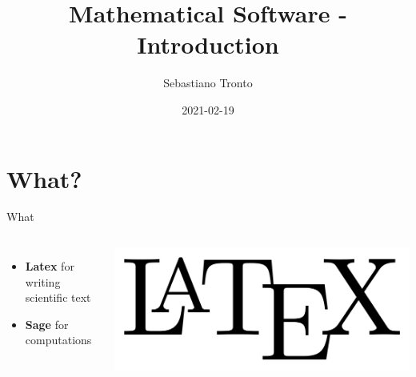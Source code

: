 \documentclass[11pt]{beamer}
\author[\texttt{sebastiano.tronto@uni.lu}]{Sebastiano Tronto}
\title{Mathematical Software - Introduction}
\date{2021-02-19}
\begin{document}
\begin{frame}
  \titlepage
\end{frame}

\begin{frame}
  \tableofcontents
\end{frame}

\section{What?}
\begin{frame}{What}
  \begin{columns}
    \begin{itemize}
      \item {\bf Latex} for writing scientific text 
      \item {\bf Sage} for computations
    \end{itemize}

    \includegraphics[scale=0.1]{img/latex.png}
    \vspace{0.5cm}

    
  \end{columns}
\end{frame}
\end{document}
